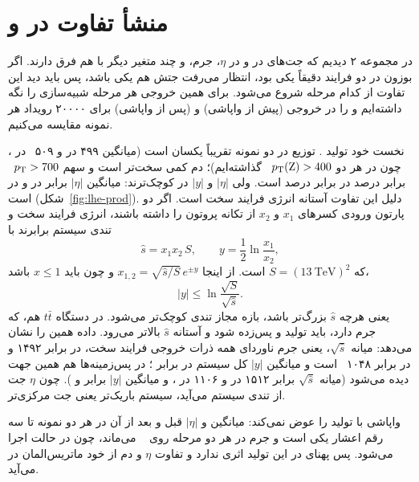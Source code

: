\section{منشأ تفاوت {\boldmath\Zbos}{} در {\boldmath\Zjet} و {\boldmath\ttZ}}
\label{sec:zorigin}
در مجموعه ۲ دیدیم که جت‌های \Zbb در \Zjet و \ttZ در $\eta$، جرم،  و چند متغیر دیگر با هم فرق دارند. اگر بوزون \Zbos{} در دو فرایند دقیقاً یکی بود، انتظار می‌رفت جتش هم یکی باشد، پس باید دید این تفاوت از کدام مرحله شروع می‌شود. برای همین خروجی هر مرحله شبیه‌سازی را نگه داشته‌ایم و \Zbos{} را در خروجی  (پیش از واپاشی) و  (پس از واپاشی) برای ۲۰۰۰۰ رویداد هر نمونه مقایسه می‌کنیم.

نخست خود تولید \Zbos{}. توزیع \pt در دو نمونه تقریباً یکسان است (میانگین ۴۹۹ در \Zjet و ۵۰۹~ در \ttZ، چون در هر دو $p_\mathrm{T}(\mathrm{Z})>400$~ گذاشته‌ایم)؛ دم \ttZ کمی سخت‌تر است و سهم $p_\mathrm{T}>700$~ برابر  درصد در برابر  درصد است. ولی $|\eta|$ و $|y|$ در \ttZ کوچک‌ترند: میانگین $|\eta|$ برابر  در \Zjet و  در \ttZ است (شکل~\ref{fig:lhe-prod}). دلیل این تفاوت آستانه انرژی فرایند سخت است. اگر دو پارتون ورودی کسرهای $x_1$ و $x_2$ از تکانه پروتون را داشته باشند، انرژی فرایند سخت و تندی سیستم برابرند با
\[
\hat s = x_1 x_2\, S,\qquad y=\frac12\ln\frac{x_1}{x_2},
\]
که $S=(13~\mathrm{TeV})^2$ است. از اینجا $x_{1,2}=\sqrt{\hat s/S}\,e^{\pm y}$ و چون باید $x\le1$ باشد،
\[
|y|\le \ln\frac{\sqrt{S}}{\sqrt{\hat s}}.
\]
یعنی هرچه $\hat s$ بزرگ‌تر باشد، بازه مجاز تندی کوچک‌تر می‌شود. در \ttZ دستگاه $t\bar t$ هم، که جرم دارد، باید تولید و پس‌زده شود و آستانه $\hat s$ بالاتر می‌رود. داده همین را نشان می‌دهد: میانه $\sqrt{\hat s}$، یعنی جرم ناوردای همه ذرات خروجی فرایند سخت، در \ttZ برابر ۱۴۹۲ و در \Zjet برابر ۱۰۴۸~ است و میانگین $|y|$ کل سیستم  در برابر ؛ در پس‌زمینه‌ها هم همین جهت دیده می‌شود (میانه $\sqrt{\hat s}$ برابر ۱۵۱۲ در \ttbb و ۱۱۰۶ در \bbbb، و میانگین $|y|$ برابر  و ). چون $\eta$ جت از تندی سیستم می‌آید، سیستم باریک‌تر یعنی جت مرکزی‌تر.


واپاشی با  تولید \Zbos{} را عوض نمی‌کند: میانگین \pt و $|\eta|$ قبل و بعد از آن در هر دو نمونه تا سه رقم اعشار یکی است و جرم \Zbos{} در هر دو مرحله روی ~ می‌ماند، چون  در حالت  اجرا می‌شود. پس پهنای \Zbos{} در این تولید اثری ندارد و تفاوت $\eta$ و دم \pt از خود ماتریس‌المان در  می‌آید.

